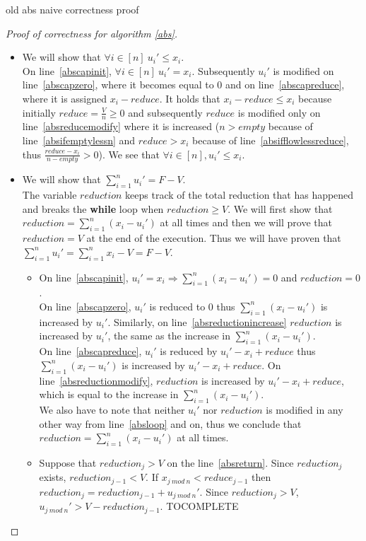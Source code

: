 old abs naive correctness proof
\begin{proof}[Proof of correctness for algorithm \ref{abs}]
   \begin{itemize}
      \item We will show that $\forall i \in [n] \: u_i' \leq x_i$. \\
      On line~\ref{abscapinit}, $\forall i \in [n] \: u_i' = x_i$. Subsequently $u_i'$ is modified on
      line~\ref{abscapzero}, where it becomes equal to 0 and on line~\ref{abscapreduce}, where it is assigned
      $x_i - reduce$. It holds that $x_i - reduce \leq x_i$ because initially $reduce = \frac{V}{n} \geq 0$ and
      subsequently $reduce$ is modified only on line~\ref{absreducemodify} where it is increased ($n > empty$ because of
      line~\ref{absifemptylessn} and $reduce > x_i$ because of line~\ref{absifflowlessreduce}, thus
      $\frac{reduce - x_i}{n - empty} > 0$). We see that $\forall i \in [n], u_i' \leq x_i$.
      \item We will show that $\sum\limits_{i=1}^{n}u_i' = F - V$. \\
      The variable $reduction$ keeps track of the total reduction that has happened and breaks the \textbf{while} loop
      when $reduction \geq V$. We will first show that $reduction = \sum\limits_{i=1}^{n}(x_i- u_i')$ at all times and
      then we will prove that $reduction = V$ at the end of the execution. Thus we will have proven that
      $\sum\limits_{i=1}^{n}u_i'= \sum\limits_{i=1}^{n}x_i - V = F - V$.
      \begin{itemize}
         \item On line~\ref{abscapinit}, $u_i' = x_i \Rightarrow \sum\limits_{i=1}^{n}(x_i- u_i') = 0$ and
         $reduction = 0$. \\
         On line~\ref{abscapzero}, $u_i'$ is reduced to 0 thus $\sum\limits_{i=1}^{n}(x_i- u_i')$ is increased by $u_i'$.
         Similarly, on line~\ref{absreductionincrease} $reduction$ is increased by $u_i'$, the same as the increase in
         $\sum\limits_{i=1}^{n}(x_i- u_i')$. \\
         On line~\ref{abscapreduce}, $u_i'$ is reduced by $u_i' - x_i + reduce$ thus $\sum\limits_{i=1}^{n}(x_i- u_i')$
         is increased by $u_i' - x_i + reduce$. On line~\ref{absreductionmodify}, $reduction$ is increased by
         $u_i' - x_i + reduce$, which is equal to the increase in $\sum\limits_{i=1}^{n}(x_i- u_i')$. \\
         We also have to note that neither $u_i'$ nor $reduction$ is modified in any other way from line~\ref{absloop}
         and on, thus we conclude that $reduction = \sum\limits_{i=1}^{n}(x_i- u_i')$ at all times.
         \item Suppose that $reduction_j > V$ on the line~\ref{absreturn}. Since $reduction_j$ exists, $reduction_{j-1} < V$.
         If $x_{j \: mod \: n} < reduce_{j-1}$ then $reduction_j = reduction_{j-1} + u_{j \: mod \:n}'$.
         Since $reduction_j > V$, $u_{j \: mod \:n}' > V - reduction_{j-1}$. TOCOMPLETE\\

      \end{itemize}
   \end{itemize}
\end{proof}

